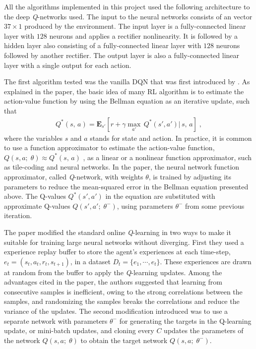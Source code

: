 \documentclass[a4paper]{article}
\begin{document}
All the algorithms implemented in this project used the following architecture to the deep \textit{Q}-networks used. The input to the neural networks consists of an vector $37 \times 1$ produced by the environment. The input layer is a fully-connected linear layer with $128$ neurons and applies a rectifier nonlinearity. It is followed by a hidden layer also consisting of a fully-connected linear layer with $128$ neurons followed by another rectifier. The output layer is also a fully-connected linear layer with a single output for each action.

The first algorithm tested was the vanilla DQN that was first introduced by \cite{mnih2015humanlevel}. As explained in the paper, the basic idea of many RL algorithm is to estimate the action-value function by using the Bellman equation as an iterative update, such that
\begin{gather*}
  Q^*(s, \, a) = \mathbf{E}_{s'} \left [r + \gamma \underset{a'}{\max} \, Q^{*} (s', a')|\,  s ,\, a\right ] \;,
\end{gather*}
where the variables $s$ and $a$ stands for state and action. In practice, it is common to use a function approximator to estimate the action-value function, $Q(s, a; \;\theta) \approx Q^*(s, \, a)$ ,  as a linear or a nonlinear function approximator, such as tile-coding and neural networks. In the paper, the neural network function approximator, called \textit{Q}-network, with weights $\theta$, is trained by adjusting its parameters to reduce the mean-squared error in the Bellman equation presented above. The Q-values $Q^{*} (s', a')$ in the equation are substituted with approximate Q-values $Q(s', a'; \;\theta^{-})$, using parameters $\theta^{-}$ from some previous iteration.

The paper modified the standard online \textit{Q}-learning in two ways to make it suitable for training large neural networks without diverging. First they used a experience replay buffer to store the agent's experiences at each time-step, $e_t = (s_t, a_t, r_t, s_{t+1})$, in a dataset $D_t = \{e_1, \cdots ,e_t\}$. These experiences are drawn at random from the buffer to apply the \textit{Q}-learning updates. Among the advantages cited in the paper, the authors suggested that learning from consecutive samples is inefficient, owing to the strong correlations between the samples, and randomizing the samples breaks the correlations and reduce the variance of the updates. The second modification introduced was to use a separate network with parameters $\theta^{-}$ for generating the targets in the Q-learning update, or mini-batch updates, and cloning every $C$ updates the parameters of the network $Q(s, a; \;\theta)$ to obtain the target network $Q(s, a; \;\theta^{-})$.
\end{document}
